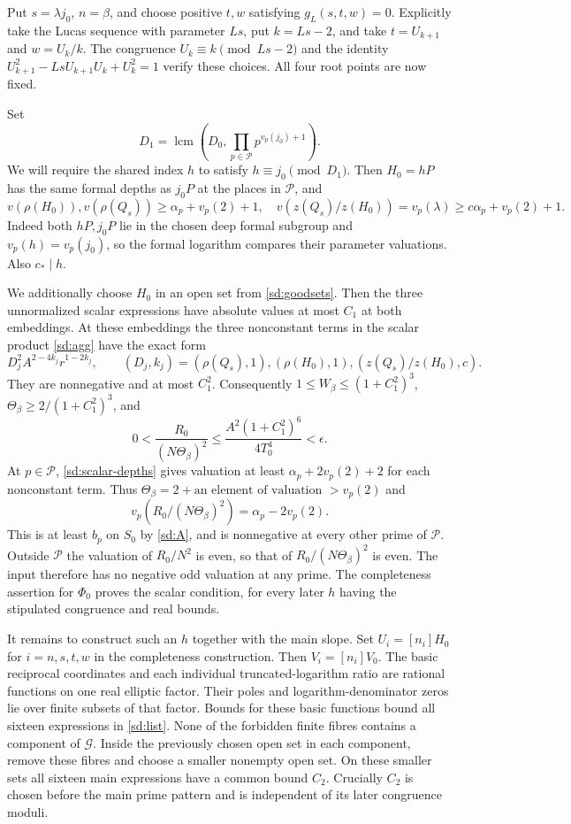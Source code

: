 Put $s=\lambda j_0$, $n=\beta$, and choose positive $t,w$ satisfying
$g_L(s,t,w)=0$. Explicitly take the Lucas sequence with parameter $Ls$,
put $k=Ls-2$, and take $t=U_{k+1}$ and $w=U_k/k$.
The congruence $U_k\equiv k\pmod{Ls-2}$ and the identity
$U_{k+1}^2-LsU_{k+1}U_k+U_k^2=1$ verify these choices.
All four root points are now fixed.

Set
\begin{equation}\label{sd:fixedmodulus}
 D_1=\operatorname{lcm}\left(D_0,
               \prod_{p\in\mathcal P}p^{v_p(j_0)+1}\right).
\end{equation}
We will require the shared index $h$ to satisfy $h\equiv j_0\pmod{D_1}$.
Then $H_0=hP$ has the same formal depths as $j_0P$ at the places in
$\mathcal P$, and
\begin{equation}\label{sd:scalar-depths}
 v(\rho(H_0)),v(\rho(Q_s))\ge\alpha_p+v_p(2)+1,
 \quad v(z(Q_s)/z(H_0))=v_p(\lambda)\ge c\alpha_p+v_p(2)+1.
\end{equation}
Indeed both $hP,j_0P$ lie in the chosen deep formal subgroup and
$v_p(h)=v_p(j_0)$, so the formal logarithm compares their parameter
valuations. Also $c_*\mid h$.

We additionally choose $H_0$ in an open set from \eqref{sd:goodsets}.
Then the three unnormalized scalar expressions have absolute values at
most $C_1$ at both embeddings. At these embeddings the three nonconstant
terms in the scalar product \eqref{sd:agg} have the exact form
\[
 D_j^2 A^{2-4k_j}r^{1-2k_j},
 \qquad (D_j,k_j)=(\rho(Q_s),1),(\rho(H_0),1),(z(Q_s)/z(H_0),c).
\]
They are nonnegative and at most $C_1^2$.
Consequently $1\le W_\beta\le(1+C_1^2)^3$,
$\Theta_\beta\ge2/(1+C_1^2)^3$, and
\[
 0<\frac{R_0}{(N\Theta_\beta)^2}
 \le\frac{A^2(1+C_1^2)^6}{4T_0^4}<\epsilon.
\]
At $p\in\mathcal P$, \eqref{sd:scalar-depths} gives valuation at least
$\alpha_p+2v_p(2)+2$ for each nonconstant term. Thus
$\Theta_\beta=2+\text{an element of valuation }>v_p(2)$ and
\[
 v_p\left(R_0/(N\Theta_\beta)^2\right)=\alpha_p-2v_p(2).
\]
This is at least $b_p$ on $S_0$ by \eqref{sd:A}, and is nonnegative at
every other prime of $\mathcal P$. Outside $\mathcal P$ the valuation of
$R_0/N^2$ is even, so that of $R_0/(N\Theta_\beta)^2$ is even.
The input therefore has no negative odd valuation at any prime.
The completeness assertion for $\Phi_0$ proves the scalar condition,
for every later $h$ having the stipulated congruence and real bounds.

It remains to construct such an $h$ together with the main slope.
Set $U_i=[n_i]H_0$ for $i=n,s,t,w$ in the completeness construction.
Then $V_i=[n_i]V_0$. The basic reciprocal coordinates and each individual
truncated-logarithm ratio are rational functions on one real elliptic factor.
Their poles and logarithm-denominator zeros lie over finite subsets of
that factor. Bounds for these basic functions bound all sixteen expressions
in \eqref{sd:list}. None of the forbidden finite fibres contains a
component of $\mathcal G$.
Inside the previously chosen open set in each component, remove these
fibres and choose a smaller nonempty open set. On these smaller sets all
sixteen main expressions have a common bound $C_2$. Crucially $C_2$ is
chosen before the main prime pattern and is independent of its later
congruence moduli.

